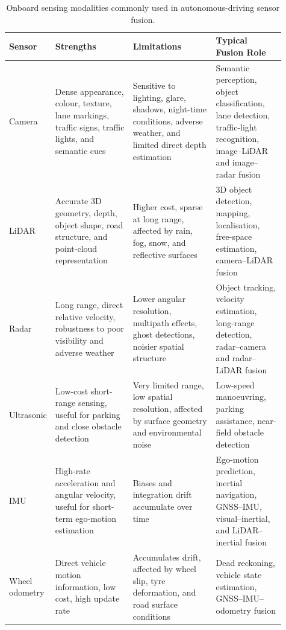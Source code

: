 \documentclass{ieeeaccess}
\begin{document}
\begin{table}[!t]
    \centering
    \small
    \caption{Onboard sensing modalities commonly used in autonomous-driving sensor fusion.}
    \label{tab:av-onboard-sensors}
    \begin{tabular}{p{0.08\linewidth} p{0.28\linewidth} p{0.30\linewidth} p{0.25\linewidth}}
        \hline
        \textbf{Sensor} & \textbf{Strengths} & \textbf{Limitations} & \textbf{Typical Fusion Role} \\
        \hline
        Camera & Dense appearance, colour, texture, lane markings, traffic signs, traffic lights, and semantic cues & Sensitive to lighting, glare, shadows, night-time conditions, adverse weather, and limited direct depth estimation & Semantic perception, object classification, lane detection, traffic-light recognition, image--LiDAR and image--radar fusion \\
        \hline
        LiDAR & Accurate 3D geometry, depth, object shape, road structure, and point-cloud representation & Higher cost, sparse at long range, affected by rain, fog, snow, and reflective surfaces & 3D object detection, mapping, localisation, free-space estimation, camera--LiDAR fusion \\
        \hline
        Radar & Long range, direct relative velocity, robustness to poor visibility and adverse weather & Lower angular resolution, multipath effects, ghost detections, noisier spatial structure & Object tracking, velocity estimation, long-range detection, radar--camera and radar--LiDAR fusion \\
        \hline
        Ultrasonic & Low-cost short-range sensing, useful for parking and close obstacle detection & Very limited range, low spatial resolution, affected by surface geometry and environmental noise & Low-speed manoeuvring, parking assistance, near-field obstacle detection \\
        \hline
        IMU & High-rate acceleration and angular velocity, useful for short-term ego-motion estimation & Biases and integration drift accumulate over time & Ego-motion prediction, inertial navigation, GNSS--IMU, visual--inertial, and LiDAR--inertial fusion \\
        \hline
        Wheel odometry & Direct vehicle motion information, low cost, high update rate & Accumulates drift, affected by wheel slip, tyre deformation, and road surface conditions & Dead reckoning, vehicle state estimation, GNSS--IMU--odometry fusion \\
        \hline
    \end{tabular}
\end{table}
\end{document}
